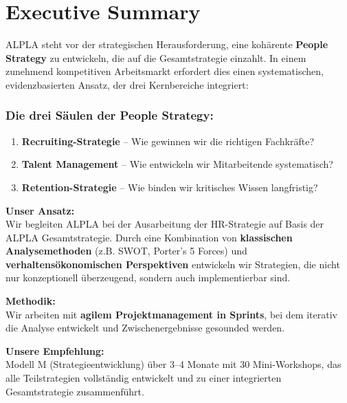 \documentclass[11pt,a4paper]{article}
\begin{document}
\newpage

\section*{Executive Summary}

ALPLA steht vor der strategischen Herausforderung, eine kohärente \textbf{People Strategy} zu entwickeln, die auf die Gesamtstrategie einzahlt. In einem zunehmend kompetitiven Arbeitsmarkt erfordert dies einen systematischen, evidenzbasierten Ansatz, der drei Kernbereiche integriert:

\subsubsection*{Die drei Säulen der People Strategy:}
\begin{enumerate}
    \item \textbf{Recruiting-Strategie} -- Wie gewinnen wir die richtigen Fachkräfte?
    \item \textbf{Talent Management} -- Wie entwickeln wir Mitarbeitende systematisch?
    \item \textbf{Retention-Strategie} -- Wie binden wir kritisches Wissen langfristig?
\end{enumerate}

\textbf{Unser Ansatz:}\\
Wir begleiten ALPLA bei der Ausarbeitung der HR-Strategie auf Basis der ALPLA Gesamtstrategie. Durch eine Kombination von \textbf{klassischen Analysemethoden} (z.B. SWOT, Porter's 5 Forces) und \textbf{verhaltensökonomischen Perspektiven} entwickeln wir Strategien, die nicht nur konzeptionell überzeugend, sondern auch implementierbar sind.

\textbf{Methodik:}\\
Wir arbeiten mit \textbf{agilem Projektmanagement in Sprints}, bei dem iterativ die Analyse entwickelt und Zwischenergebnisse gesounded werden.

\begin{recbox}
\textbf{Unsere Empfehlung:}\\
Modell M (Strategieentwicklung) über 3--4 Monate mit 30 Mini-Workshops, das alle Teilstrategien vollständig entwickelt und zu einer integrierten Gesamtstrategie zusammenführt.
\end{recbox}
\end{document}
